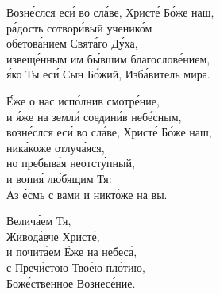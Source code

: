 \documentclass{article}
\begin{document}
%
Возне́слся еси́ во сла́ве, Христе́ Бо́же наш, \\
ра́дость сотвори́вый ученико́м \\
обетова́нием Свята́го Ду́ха, \\
извеще́нным им бы́вшим благослове́нием, \\
я́ко Ты еси́ Сын Бо́жий, Изба́витель мира.

Е́же о нас испо́лнив смотре́ние,\\
и я́же на земли́ соедини́в небе́сным,\\
возне́слся еси́ во сла́ве, Христе́ Бо́же наш,\\
ника́коже отлуча́яся,\\
но пребыва́я неотсту́пный,\\
и вопия́ лю́бящим Тя:\\
Аз е́́смь с вами и никто́же на вы.

Велича́ем Тя, \\
Живода́вче Христе́, \\
и почита́ем Е́же на небеса́, \\
с Пречи́стою Твое́ю пло́тию, \\
Боже́ственное Вознесе́ние.
\end{document}
